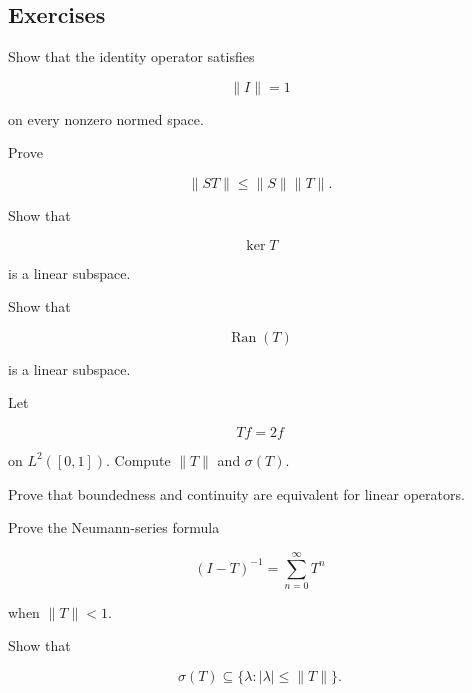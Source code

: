 \subsection{Exercises}
\label{subsec:operator-theory-exercises}

\begin{exercise}[1]
Show that the identity operator satisfies

\[
\|I\|=1
\]

on every nonzero normed space.
\end{exercise}

\begin{exercise}[1]
Prove

\[
\|ST\|
\leq
\|S\|\|T\|.
\]
\end{exercise}

\begin{exercise}[1]
Show that

\[
\ker T
\]

is a linear subspace.
\end{exercise}

\begin{exercise}[1]
Show that

\[
\operatorname{Ran}(T)
\]

is a linear subspace.
\end{exercise}

\begin{exercise}[1]
Let

\[
Tf=2f
\]

on \(L^2([0,1])\). Compute \(\|T\|\) and \(\sigma(T)\).
\end{exercise}

\begin{exercise}[2]
Prove that boundedness and continuity are equivalent for linear
operators.
\end{exercise}

\begin{exercise}[2]
Prove the Neumann-series formula

\[
(I-T)^{-1}
=
\sum_{n=0}^{\infty}T^n
\]

when \(\|T\|<1\).
\end{exercise}

\begin{exercise}[2]
Show that

\[
\sigma(T)
\subseteq
\{
\lambda:|\lambda|\leq\|T\|
\}.
\]
\end{exercise}

